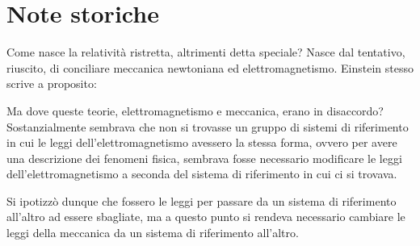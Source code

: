 \chapter{Note storiche}
\minitoc Come nasce la relativit\`a ristretta, altrimenti detta
speciale? Nasce dal tentativo, riuscito, di conciliare meccanica
newtoniana ed elettromagnetismo. Einstein stesso scrive a proposito:
\begin{quote}
\end{quote}
Ma dove queste teorie, elettromagnetismo e meccanica, erano in
disaccordo? 
Sostanzialmente sembrava che non si trovasse un gruppo di sistemi di
riferimento in cui le leggi dell'elettromagnetismo avessero la stessa
forma, ovvero per avere una descrizione dei fenomeni fisica, sembrava
fosse necessario modificare le leggi dell'elettromagnetismo a seconda
del sistema di riferimento in cui ci si trovava.

Si ipotizz\`o dunque che fossero le leggi per passare da un sistema di
riferimento all'altro ad essere sbagliate, ma a questo punto si rendeva
necessario cambiare le leggi della meccanica da un sistema di
riferimento all'altro.

